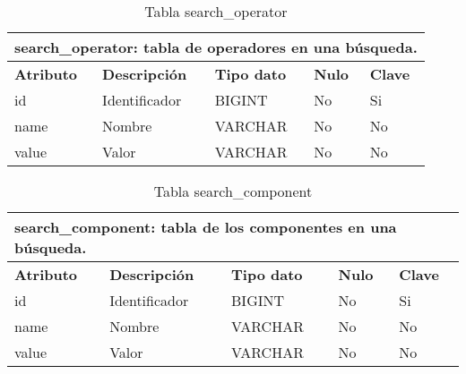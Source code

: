 \begin{table}[!hbt]
	\begin{center}
		\begin{tabular}{|p{3cm}|p{4cm}|p{4cm}|p{2cm}|p{2cm}|}
			\hline
			\multicolumn{5}{|l|}{\textbf{search\_operator:} tabla de operadores en una búsqueda.} \\
			\hline
			\hline
			\textbf{Atributo} & \textbf{Descripción} & \textbf{Tipo dato} & \textbf{Nulo} & \textbf{Clave}\\
			\hline
			id & Identificador  & BIGINT & No & Si\\
			\hline
			name & Nombre & VARCHAR & No & No\\
			\hline
			value & Valor & VARCHAR & No & No\\
			\hline
		\end{tabular}
		\caption{Tabla search\_operator}
		\label{table:db-searchoperator}
	\end{center}
\end{table}

\begin{table}[!hbt]
	\begin{center}
		\begin{tabular}{|p{3cm}|p{4cm}|p{4cm}|p{2cm}|p{2cm}|}
			\hline
			\multicolumn{5}{|l|}{\textbf{search\_component:} tabla de los componentes en una búsqueda.} \\
			\hline
			\hline
			\textbf{Atributo} & \textbf{Descripción} & \textbf{Tipo dato} & \textbf{Nulo} & \textbf{Clave}\\
			\hline
			id & Identificador  & BIGINT & No & Si\\
			\hline
			name & Nombre & VARCHAR & No & No\\
			\hline
			value & Valor & VARCHAR & No & No\\
			\hline
		\end{tabular}
		\caption{Tabla search\_component}
		\label{table:db-searchcomponent}
	\end{center}
\end{table}

